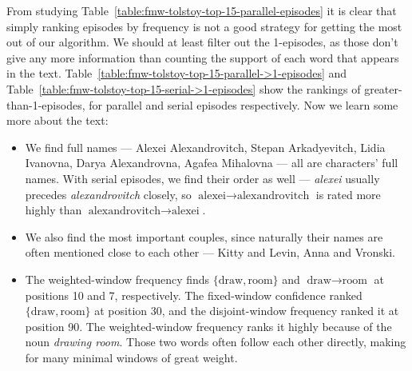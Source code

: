 From studying Table~\ref{table:fmw-tolstoy-top-15-parallel-episodes} it is clear that simply ranking episodes by frequency is not a good strategy for getting the most out of our algorithm. We should at least filter out the 1-episodes, as those don't give any more information than counting the support of each word that appears in the text. Table~\ref{table:fmw-tolstoy-top-15-parallel->1-episodes} and Table~\ref{table:fmw-tolstoy-top-15-serial->1-episodes} show the rankings of greater-than-1-episodes, for parallel and serial episodes respectively. Now we learn some more about the text:
\begin{itemize}
\item We find full names --- Alexei Alexandrovitch, Stepan Arkadyevitch, Lidia Ivanovna, Darya Alexandrovna, Agafea Mihalovna --- all are characters' full names. With serial episodes, we find their order as well --- \emph{alexei} usually precedes \emph{alexandrovitch} closely, so $ \text{alexei} \to \text{alexandrovitch} $ is rated more highly than $ \text{alexandrovitch} \to \text{alexei} $.
\item We also find the most important couples, since naturally their names are often mentioned close to each other --- Kitty and Levin, Anna and Vronski.
\item The weighted-window frequency finds $ \{ \text{draw}, \text{room} \} $ and $ \text{draw} \to \text{room} $ at positions 10 and 7, respectively. The fixed-window confidence ranked $ \{ \text{draw}, \text{room} \} $ at position 30, and the disjoint-window frequency ranked it at position 90. The weighted-window frequency ranks it highly because of the noun \emph{drawing room}. Those two words often follow each other directly, making for many minimal windows of great weight.
\end{itemize}


